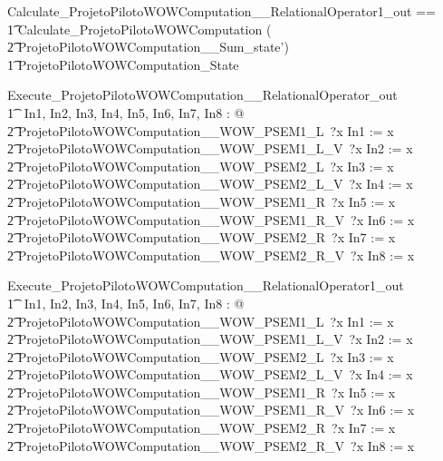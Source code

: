\documentclass{article}
\begin{document}
\begin{circusaction}
  Calculate\_ProjetoPilotoWOWComputation\_\_RelationalOperator1\_out ==\\
    \t1 Calculate\_ProjetoPilotoWOWComputation \hide (\\
      \t2 ProjetoPilotoWOWComputation\_\_Sum\_state')\\
    \t1 \land \Xi ProjetoPilotoWOWComputation\_State
\end{circusaction}
\vspace{-2.8em}

\begin{circusaction}
  Execute\_ProjetoPilotoWOWComputation\_\_RelationalOperator\_out \circdef\\
    \t1 \circvar\ In1, In2, In3, In4, In5, In6, In7, In8 : \nat @\\
      \t2 ProjetoPilotoWOWComputation\_\_WOW\_PSEM1\_L~?x \then In1 := x \circseq\\
      \t2 ProjetoPilotoWOWComputation\_\_WOW\_PSEM1\_L\_V~?x \then In2 := x \circseq\\
      \t2 ProjetoPilotoWOWComputation\_\_WOW\_PSEM2\_L~?x \then In3 := x \circseq\\
      \t2 ProjetoPilotoWOWComputation\_\_WOW\_PSEM2\_L\_V~?x \then In4 := x \circseq\\
      \t2 ProjetoPilotoWOWComputation\_\_WOW\_PSEM1\_R~?x \then In5 := x \circseq\\
      \t2 ProjetoPilotoWOWComputation\_\_WOW\_PSEM1\_R\_V~?x \then In6 := x \circseq\\
      \t2 ProjetoPilotoWOWComputation\_\_WOW\_PSEM2\_R~?x \then In7 := x \circseq\\
      \t2 ProjetoPilotoWOWComputation\_\_WOW\_PSEM2\_R\_V~?x \then In8 := x
\end{circusaction}
\vspace{-2.8em}

\begin{circusaction}
  Execute\_ProjetoPilotoWOWComputation\_\_RelationalOperator1\_out \circdef\\
    \t1 \circvar\ In1, In2, In3, In4, In5, In6, In7, In8 : \nat @\\
      \t2 ProjetoPilotoWOWComputation\_\_WOW\_PSEM1\_L~?x \then In1 := x \circseq\\
      \t2 ProjetoPilotoWOWComputation\_\_WOW\_PSEM1\_L\_V~?x \then In2 := x \circseq\\
      \t2 ProjetoPilotoWOWComputation\_\_WOW\_PSEM2\_L~?x \then In3 := x \circseq\\
      \t2 ProjetoPilotoWOWComputation\_\_WOW\_PSEM2\_L\_V~?x \then In4 := x \circseq\\
      \t2 ProjetoPilotoWOWComputation\_\_WOW\_PSEM1\_R~?x \then In5 := x \circseq\\
      \t2 ProjetoPilotoWOWComputation\_\_WOW\_PSEM1\_R\_V~?x \then In6 := x \circseq\\
      \t2 ProjetoPilotoWOWComputation\_\_WOW\_PSEM2\_R~?x \then In7 := x \circseq\\
      \t2 ProjetoPilotoWOWComputation\_\_WOW\_PSEM2\_R\_V~?x \then In8 := x
\end{circusaction}
\vspace{-2.8em}
\end{document}
